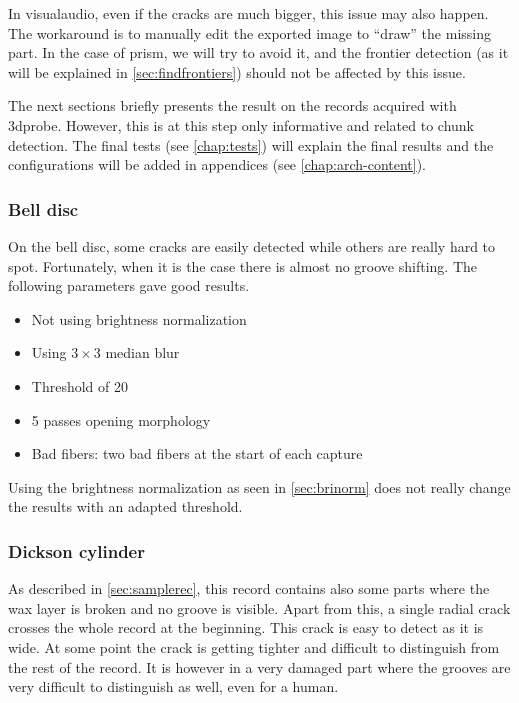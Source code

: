 In \gls{visualaudio}, even if the cracks are much bigger, this issue may also happen. The workaround is to manually edit the exported image to ``draw'' the missing part. In the case of \gls{prism}, we will try to avoid it, and the frontier detection (as it will be explained in \autoref{sec:findfrontiers}) should not be affected by this issue.

The next sections briefly presents the result on the records acquired with \gls{3dprobe}. However, this is at this step only informative and related to chunk detection. The final tests (see \autoref{chap:tests}) will explain the final results and the configurations will be added in appendices (see \autoref{chap:arch-content}).

\subsubsection{Bell disc}

On the bell disc, some cracks are easily detected while others are really hard to spot. Fortunately, when it is the case there is almost no groove shifting. The following parameters gave good results.

\begin{itemize}
\item Not using brightness normalization
\item Using $3 \times 3$ median blur
\item Threshold of 20
\item 5 passes opening morphology
\item Bad fibers: two bad fibers at the start of each capture
\end{itemize}

Using the brightness normalization as seen in \autoref{sec:brinorm} does not really change the results with an adapted threshold.

\subsubsection{Dickson cylinder}

As described in \autoref{sec:samplerec}, this record contains also some parts where the wax layer is broken and no groove is visible. Apart from this, a single radial crack crosses the whole record at the beginning. This crack is easy to detect as it is wide. At some point the crack is getting tighter and difficult to distinguish from the rest of the record. It is however in a very damaged part where the grooves are very difficult to distinguish as well, even for a human.

